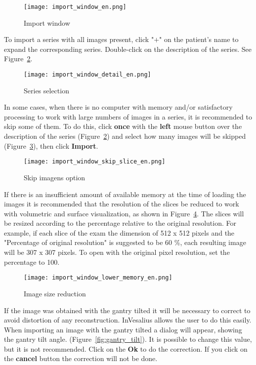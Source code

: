 \begin{figure}[!htb]
\centering
\texttt{[image: import\_window\_en.png]}
\caption{Import window}
\label{fig:win_import}
\end{figure}

\newpage

To import a series with all images present, click "\textbf{$+$}" on the patient’s name to expand the corresponding series. Double-click on the description of the series. See Figure~\ref{fig:import_serie}.

\begin{figure}[!htb]
\centering
\texttt{[image: import\_window\_detail\_en.png]}
\caption{Series selection}
\label{fig:import_serie}
\end{figure}

In some cases, when there is no computer with memory and/or satisfactory processing to work with large numbers of images in a series, it is recommended to skip some of them. To do this, click \textbf{once} with the \textbf{left} mouse button over the description of the series (Figure~\ref{fig:import_serie}) and select how many images will be skipped (Figure~\ref{fig:skip_image}), then click \textbf{Import}.

\begin{figure}[!htb]
\centering
\texttt{[image: import\_window\_skip\_slice\_en.png]}
\caption{Skip imagens option}
\label{fig:skip_image}
\end{figure}

If there is an insufficient amount of available memory at the time of loading the images it is recommended that the resolution of the slices be reduced to work with volumetric and surface visualization, as shown in Figure~\ref{fig:resize_image}.
The slices will be resized according to the percentage relative to the original resolution. For example, if each slice of the exam the dimension of 512 x 512 pixels and the "Percentage of original resolution" is suggested to be 60 \%, each resulting image will be 307 x 307 pixels. To open with the original pixel resolution, set the percentage to 100.

\begin{figure}[!htb]
\centering
\texttt{[image: import\_window\_lower\_memory\_en.png]}
\caption{Image size reduction}
\label{fig:resize_image}
\end{figure}

If the image was obtained with the gantry tilted it will be necessary to correct to avoid distortion of any reconstruction. InVesalius allows the user to do this easily. When importing an image with the gantry tilted a dialog will appear, showing the gantry tilt angle. (Figure~\ref{fig:gantry_tilt}). It is possible to change this value, but it is not recommended. Click on the \textbf{Ok} to do the correction. If you click on the \textbf{cancel} button the correction will not be done.

